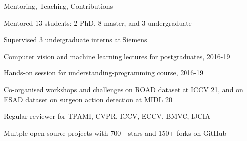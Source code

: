 \documentclass{resume} %
\begin{document}
\begin{paracol}{2}


\begin{rSection}{Mentoring, Teaching, Contributions}{} 
\begin{sSubsection}{Mentored 13 students: 2 PhD, 8 master, and 3 undergraduate} \end{sSubsection} %
\begin{sSubsection}{Supervised 3 undergraduate interns at Siemens}\end{sSubsection}
\begin{sSubsection}{Computer vision and machine learning lectures for postgraduates, 2016-19}\end{sSubsection}
\begin{sSubsection}{Hands-on session for understanding-programming course, 2016-19}\end{sSubsection}
\begin{sSubsection}{Co-organised workshops and challenges on ROAD dataset at ICCV 21, and on ESAD dataset on surgeon action detection at MIDL 20}\end{sSubsection}
\begin{sSubsection}{Regular reviewer for TPAMI, CVPR, ICCV, ECCV, BMVC, IJCIA}\end{sSubsection}
\begin{sSubsection}{Multple open source projects with 700+ stars and 150+ forks on GitHub}\end{sSubsection}
\end{rSection}


\end{paracol}
\end{document}
